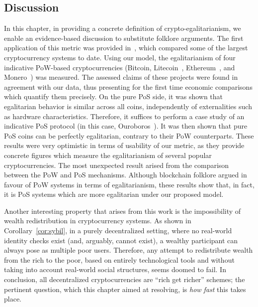 \subsection{Discussion}

In this chapter, in providing a concrete definition of crypto-egalitarianism,
we enable an evidence-based discussion to substitute folklore arguments.
The first application of this metric was provided
in~\cite{karakostas2019cryptocurrency}, which compared some of the largest
cryptocurrency systems to date.  Using our model, the egalitarianism of four
indicative PoW-based cryptocurrencies (Bitcoin,
Litecoin~\cite{lee2011litecoin}, Ethereum~\cite{buterin,wood2014ethereum}, and
Monero~\cite{van2013cryptonote}) was measured.  The assessed claims of these
projects were found in agreement with our data, thus presenting for the first
time economic comparisons which quantify them precisely. On the pure PoS side,
it was shown that egalitarian behavior is similar across all coins,
independently of externalities such as hardware characteristics. Therefore, it
suffices to perform a case study of an indicative PoS protocol (in this case,
Ouroboros~\cite{C:KRDO17}).  It was then shown that pure PoS coins can be
perfectly egalitarian, contrary to their PoW counterparts.
These results were very optimistic in terms of usability of our metric, as they
provide concrete figures which measure the egalitarianism of several popular
cryptocurrencies. The most unexpected result arised from the comparison between
the PoW and PoS mechanisms. Although blockchain folklore argued in favour of
PoW systems in terms of egalitarianism, these results show that, in fact, it is
PoS systems which are more egalitarian under our proposed model.

Another interesting property that arises from this work is the impossibility of
wealth redistribution in cryptocurrency systems. As shown in
Corollary~\ref{cor:sybil}, in a purely decentralized setting, where no
real-world identity checks exist (and, arguably, cannot exist), a wealthy
participant can always pose as multiple poor users. Therefore, any attempt to
redistribute wealth from the rich to the poor, based on entirely technological
tools and without taking into account real-world social structures, seems
doomed to fail. In conclusion, all decentralized cryptocurrencies are ``rich
get richer'' schemes; the pertinent question, which this chapter aimed at
resolving, is \emph{how fast} this takes place.
